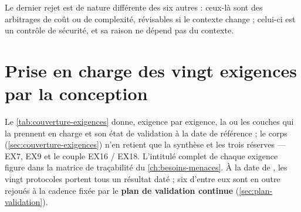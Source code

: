 Le dernier rejet est de nature différente des six autres : ceux-là sont des arbitrages de coût ou
de complexité, révisables si le contexte change ; celui-ci est un contrôle de sécurité, et sa
raison ne dépend pas du contexte.

\section{Prise en charge des vingt exigences par la conception}
\label{sec:annexe-couverture-exigences}

Le \cref{tab:couverture-exigences} donne, exigence par exigence, la ou les couches qui la prennent
en charge et son état de validation à la date de référence ; le corps
(\cref{sec:couverture-exigences}) n'en retient que la synthèse et les trois réserves ---
EX7, EX9 et le couple EX16 / EX18. L'intitulé complet de chaque exigence figure dans la matrice de
traçabilité du \cref{ch:besoins-menaces}. À la date de \dateref{}, les vingt protocoles
portent tous un résultat daté ; six d'entre eux sont en outre rejoués à la cadence fixée par le
\textbf{plan de validation continue} (\cref{sec:plan-validation}).

